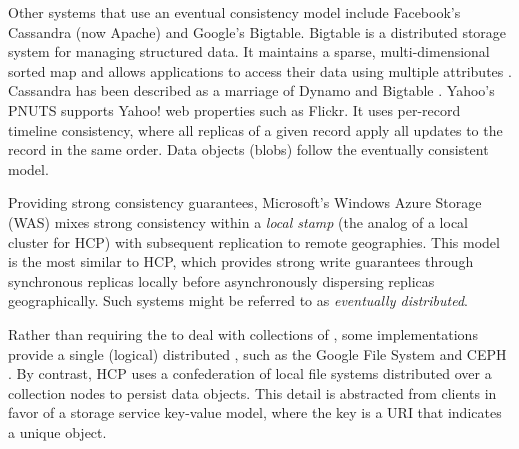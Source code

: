 Other systems that use  an eventual consistency model include Facebook's Cassandra (now Apache) and Google's Bigtable.  Bigtable is a distributed storage system for managing structured data. It maintains a sparse, multi-dimensional sorted map and allows applications to access their data using multiple attributes \cite{Chang:2008:BDS:1365815.1365816}. Cassandra has been described as a marriage of Dynamo and Bigtable \cite{Lakshman:2010:CDS:1773912.1773922}. Yahoo's PNUTS \cite{Cooper:2008:PYH:1454159.1454167} supports Yahoo! web properties such as Flickr. It uses per-record timeline consistency, where all replicas of a given record apply all updates to the record in the same order. Data objects (blobs) follow the eventually consistent model.

Providing strong consistency guarantees, Microsoft's Windows Azure Storage (WAS)  \cite{Huang:2012:ECW:2342821.2342823} mixes strong consistency within a \emph{local stamp} (the analog of a local cluster for HCP) with subsequent replication to remote geographies. This model is the most similar to HCP, which provides strong write guarantees through synchronous replicas locally before asynchronously dispersing replicas geographically. Such systems might be referred to as \emph{eventually distributed}.

Rather than requiring the \os{} to deal with collections of \fss{}, some implementations provide a single (logical) distributed \fs{}, such as the Google File System \cite{Ghemawat:2003:GFS:945445.945450} and CEPH \cite{Weil:2006:CSH:1298455.1298485}. By contrast, HCP uses a confederation of local file systems distributed over a collection nodes to persist data objects. This detail is abstracted from clients in favor of a storage service key-value model, where the key is a URI that indicates a unique object.
